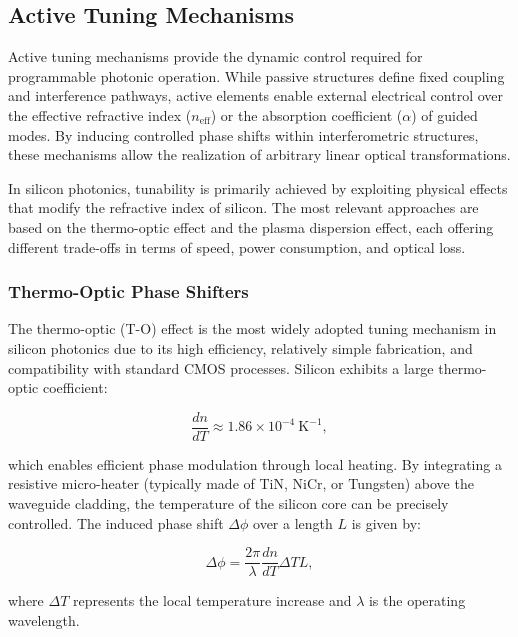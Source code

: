 \subsection{Active Tuning Mechanisms}

Active tuning mechanisms provide the dynamic control required for programmable photonic operation.
 While passive structures define fixed coupling and interference pathways, active elements enable 
 external electrical control over the effective refractive index ($n_{\text{eff}}$) or the 
 absorption coefficient ($\alpha$) of guided modes. By inducing controlled phase shifts within 
 interferometric structures, these mechanisms allow the realization of arbitrary linear optical 
 transformations.

In silicon photonics, tunability is primarily achieved by exploiting physical effects that modify 
the refractive index of silicon. The most relevant approaches are based on the thermo-optic effect 
and the plasma dispersion effect, each offering different trade-offs in terms of speed, power 
consumption, and optical loss.



\subsubsection*{Thermo-Optic Phase Shifters}

The thermo-optic (T-O) effect is the most widely adopted tuning mechanism in silicon photonics due 
to its high efficiency, relatively simple fabrication, and compatibility with standard CMOS 
processes. Silicon exhibits a large thermo-optic coefficient:

\begin{equation}
\frac{dn}{dT} \approx 1.86 \times 10^{-4} \ \text{K}^{-1},
\end{equation}

which enables efficient phase modulation through local heating. By integrating a resistive 
micro-heater (typically made of TiN, NiCr, or Tungsten) above the waveguide cladding, the 
temperature of the silicon core can be precisely controlled. The induced phase shift $\Delta \phi$ 
over a length $L$ is given by:

\begin{equation}
\Delta \phi = \frac{2\pi}{\lambda} \frac{dn}{dT} \Delta T L,
\label{eq:thermo_phase}
\end{equation}

where $\Delta T$ represents the local temperature increase and $\lambda$ is the operating 
wavelength.

